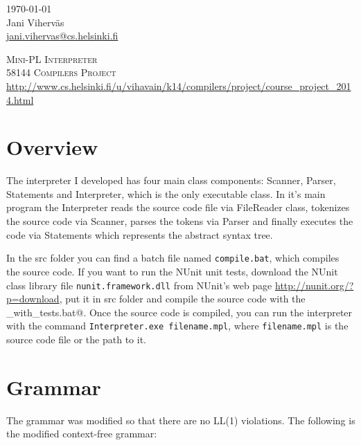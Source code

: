\documentclass[a4paper,12pt]{article}
\author{Jani Viherväs}
\newcommand{\ttt}[1]{\texttt{#1}}
\begin{document}
\thispagestyle{empty} 
\begin{flushright}
\today \\
\vspace{1em}
Jani Viherväs\\ 
\href{mailto:jani.vihervas@cs.helsinki.fi}{jani.vihervas@cs.helsinki.fi}
\end{flushright}

\vfill

\begin{center}
\textsc{\LARGE Mini-PL Interpreter} \\
\vspace{1em}
\textsc{\large 58144 Compilers Project}\\
\vspace{1em}
\url{http://www.cs.helsinki.fi/u/vihavain/k14/compilers/project/course_project_2014.html}
\end{center}

\vfill

\setcounter{page}{1}

\section{Overview}
The interpreter I developed has four main class components: Scanner,
Parser, Statements and Interpreter, which is the only executable class. In it's
main program the Interpreter reads the source code file via FileReader class,
tokenizes the source code via Scanner, parses the tokens via Parser and finally
executes the code via Statements which represents the abstract syntax tree. 

In the src folder you can find a batch file named \ttt{compile.bat}, which
compiles the source code. If you want to run the NUnit unit tests,
download the NUnit class library file \ttt{nunit.framework.dll} from
NUnit's web page \url{http://nunit.org/?p=download}, put it in src folder
and compile the source code with the \verb@compile_with_tests.bat@. Once the
source code is compiled, you can run the interpreter with the command
\ttt{Interpreter.exe filename.mpl}, where \ttt{filename.mpl} is the source code
file or the path to it.

\section{Grammar}

The grammar was modified so that there are no LL(1) violations. The
following is the modified context-free grammar:
\end{document}
